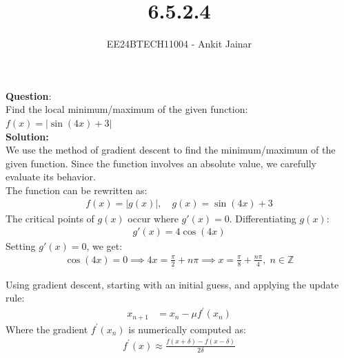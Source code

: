 \documentclass[journal]{IEEEtran}
\begin{document}

\vspace{3cm}

\title{6.5.2.4}
\author{EE24BTECH11004 - Ankit Jainar}
 \maketitle
{\let\newpage\relax\maketitle}

\renewcommand{\thefigure}{\theenumi}
\renewcommand{\thetable}{\theenumi}
\setlength{\intextsep}{10pt} %


\renewcommand{\thetable}{\theenumi}


\textbf{Question}:\\
Find the local minimum/maximum of the given function:\\
$f(x) = |\sin(4x) + 3|$
\\
\textbf{Solution: }\\
We use the method of gradient descent to find the minimum/maximum of the given function. Since the function involves an absolute value, we carefully evaluate its behavior.\\
The function can be rewritten as:
\begin{align}
    f(x) = |g(x)|, \quad g(x) = \sin(4x) + 3
\end{align}
The critical points of \(g(x)\) occur where \(g'(x) = 0\). Differentiating \(g(x)\):
\begin{align}
    g'(x) = 4\cos(4x)
\end{align}
Setting \(g'(x) = 0\), we get:
\begin{align}
    \cos(4x) = 0 \implies 4x = \frac{\pi}{2} + n\pi \implies x = \frac{\pi}{8} + \frac{n\pi}{4}, \; n \in \mathbb{Z}
\end{align}

Using gradient descent, starting with an initial guess, and applying the update rule:
\begin{align}
    x_{n+1} &= x_n - \mu f^{\prime}(x_n)
\end{align}
Where the gradient \(f^{\prime}(x_n)\) is numerically computed as:
\begin{align}
    f^{\prime}(x) \approx \frac{f(x + \delta) - f(x - \delta)}{2\delta}
\end{align}
\end{document}

